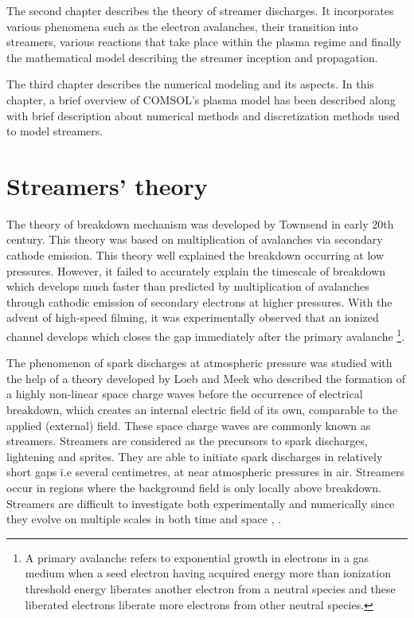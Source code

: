 \documentclass[paper=a4, fontsize=13pt]{scrartcl}
\begin{document}
The second chapter describes the theory of streamer discharges. It incorporates various phenomena such as the electron avalanches, their transition into streamers, various reactions that take place within the plasma regime and finally the mathematical model describing the streamer inception and propagation. 

The third chapter describes the numerical modeling and its aspects. In this chapter, a brief overview of COMSOL's plasma model has been described along with brief description about numerical methods and discretization methods used to model streamers. 




\section{Streamers' theory}

The theory of breakdown mechanism was developed by Townsend in early 20th century. This theory was based on multiplication of avalanches via secondary cathode emission. This theory well explained the breakdown occurring at low pressures. However, it failed to accurately explain the timescale of breakdown which develops much faster than predicted by multiplication of avalanches through cathodic emission of secondary electrons at higher pressures. With the advent of high-speed filming, it was experimentally observed that an ionized channel develops which closes the gap immediately after the primary avalanche \footnote{A primary avalanche refers to exponential growth in electrons in a gas medium when a seed electron having acquired energy more than ionization threshold energy liberates another electron from a neutral species and these liberated electrons liberate more electrons from other neutral species. }.  

The phenomenon of spark discharges at atmospheric pressure was studied with the help of a theory developed by Loeb and Meek \cite{Loeb1929THEPRESSURE} who described the formation of a highly non-linear space charge waves before the occurrence of electrical breakdown, which creates an internal electric field of its own, comparable to the applied (external) field. These space charge waves are commonly known as streamers. Streamers are considered as the precursors to spark discharges, lightening and sprites. They are able to initiate spark discharges in relatively short gaps i.e several centimetres, at near atmospheric pressures in air. Streamers occur in regions where the background field is only locally above breakdown. Streamers are difficult to investigate both experimentally and numerically since they evolve on multiple scales in both time and space \cite{Ebert2008StreamersMacroscales}, \cite{Ebert2006TheStreamers}. 
\end{document}
